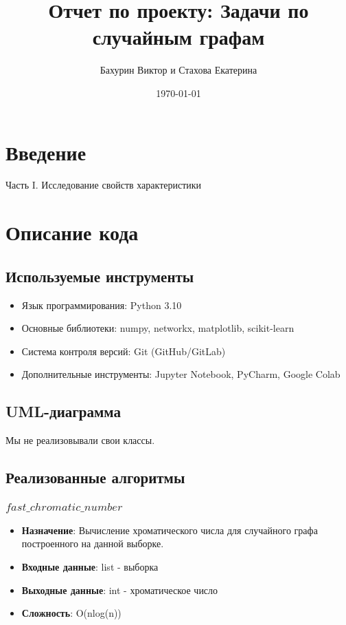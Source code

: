 \documentclass[a4paper, 12pt]{article}
\title{Отчет по проекту: Задачи по случайным графам}
\author{Бахурин Виктор и Стахова Екатерина}
\date{\today}
\begin{document}
\maketitle
\tableofcontents

\section{Введение}
Часть I. Исследование свойств характеристики

\section{Описание кода}
\subsection{Используемые инструменты}
\begin{itemize}
    \item Язык программирования: Python 3.10
    \item Основные библиотеки: numpy, networkx, matplotlib, scikit-learn
    \item Система контроля версий: Git (GitHub/GitLab)
    \item Дополнительные инструменты: Jupyter Notebook, PyCharm, Google Colab
\end{itemize}

\subsection{UML-диаграмма}
Мы не реализовывали свои классы. 

\subsection{Реализованные алгоритмы}
\subsubsection{$fast\_chromatic\_number$}
\begin{itemize}
    \item \textbf{Назначение}: Вычисление хроматического числа для случайного графа построенного на данной выборке.
    \item \textbf{Входные данные}: list - выборка
    \item \textbf{Выходные данные}: int - хроматическое число
    \item \textbf{Сложность}: O(nlog(n))
\end{itemize}
\end{document}
